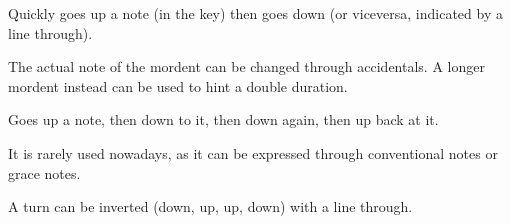 \begin{definition}[Mordent]
    Quickly goes up a note (in the key) then goes down (or viceversa, indicated by a line through).
\end{definition}

The actual note of the mordent can be changed through accidentals. A longer mordent instead can be used to hint a double duration.

\begin{definition}
    Goes up a note, then down to it, then down again, then up back at it.

    It is rarely used nowadays, as it can be expressed through conventional notes or grace notes.
\end{definition}

A turn can be inverted (down, up, up, down) with a line through.